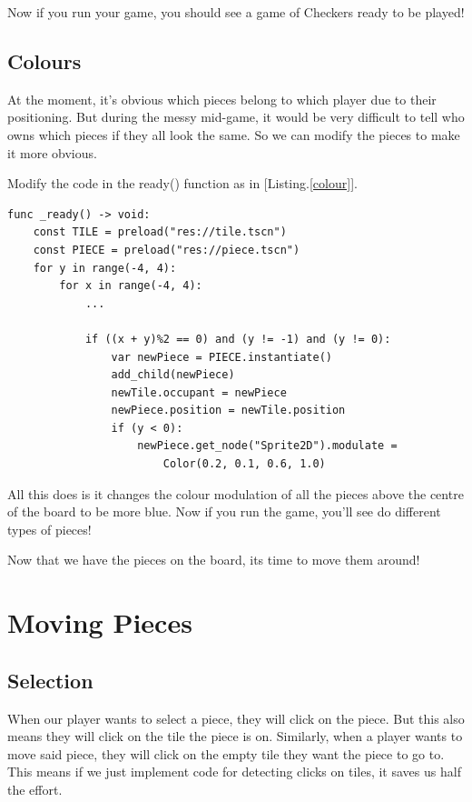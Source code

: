 \documentclass[14pt]{extarticle}
\newcommand{\prettyref}[2]{[{#1}.\ref{#2}]}
\begin{document}
Now if you run your game, you should see a game of Checkers ready to be played!

\subsection*{Colours}
At the moment, it's obvious which pieces belong to which player due to their positioning. But during the messy mid-game, it would be very difficult to tell who owns which pieces if they all look the same. So we can modify the pieces to make it more obvious.

Modify the code in the ready() function as in \prettyref{Listing}{colour}.

\begin{lstlisting}[language=gdscript, label={colour}, caption=Changing piece colour]
func _ready() -> void:
	const TILE = preload("res://tile.tscn")
	const PIECE = preload("res://piece.tscn")
	for y in range(-4, 4):
		for x in range(-4, 4):
			...
			
			if ((x + y)%2 == 0) and (y != -1) and (y != 0):
				var newPiece = PIECE.instantiate()
				add_child(newPiece)
				newTile.occupant = newPiece
				newPiece.position = newTile.position
                if (y < 0):
					newPiece.get_node("Sprite2D").modulate =
                        Color(0.2, 0.1, 0.6, 1.0)
\end{lstlisting}

All this does is it changes the colour modulation of all the pieces above the centre of the board to be more blue. Now if you run the game, you'll see do different types of pieces!

Now that we have the pieces on the board, its time to move them around!

\newpage

\section{Moving Pieces}
\subsection*{Selection}
When our player wants to select a piece, they will click on the piece. But this also means they will click on the tile the piece is on. Similarly, when a player wants to move said piece, they will click on the empty tile they want the piece to go to. This means if we just implement code for detecting clicks on tiles, it saves us half the effort.
\end{document}
